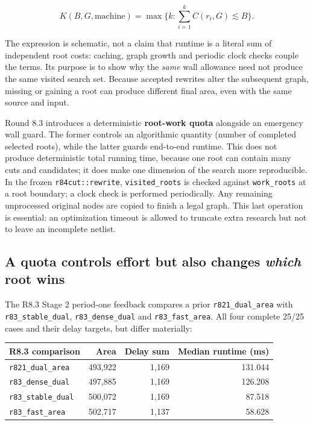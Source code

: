 \[
K(B,G,\mathrm{machine})=
\max\biggl\{k:\sum_{i=1}^{k}C(r_i,G)\lesssim B\biggr\}.
\]

The expression is schematic, not a claim that runtime is a literal sum of independent root costs: caching, graph growth and periodic clock checks couple the terms. Its purpose is to show why the \emph{same} wall allowance need not produce the same visited search set. Because accepted rewrites alter the subsequent graph, missing or gaining a root can produce different final area, even with the same source and input.

Round 8.3 introduces a deterministic \textbf{root-work quota} alongside an emergency wall guard. The former controls an algorithmic quantity (number of completed selected roots), while the latter guards end-to-end runtime. This does not produce deterministic total running time, because one root can contain many cuts and candidates; it does make one dimension of the search more reproducible. In the frozen \texttt{r84cut::rewrite}, \texttt{visited\_roots} is checked against \texttt{work\_roots} at a root boundary; a clock check is performed periodically. Any remaining unprocessed original nodes are copied to finish a legal graph. This last operation is essential: an optimization timeout is allowed to truncate extra research but not to leave an incomplete netlist.

\subsection{\texorpdfstring{A quota controls effort but also changes \emph{which} root wins}{A quota controls effort but also changes which root wins}}\label{a-quota-controls-effort-but-also-changes-which-root-wins}

The R8.3 Stage 2 period-one feedback compares a prior \texttt{r821\_dual\_area} with \texttt{r83\_stable\_dual}, \texttt{r83\_dense\_dual} and \texttt{r83\_fast\_area}. All four complete 25/25 cases and their delay targets, but differ materially:

\begin{longtable}[]{@{}lrrr@{}}
\toprule\noalign{}
R8.3 comparison & Area & Delay sum & Median runtime (ms) \\
\midrule\noalign{}
\endhead
\bottomrule\noalign{}
\endlastfoot
\texttt{r821\_dual\_area} & 493,922 & 1,169 & 131.044 \\
\texttt{r83\_dense\_dual} & 497,885 & 1,169 & 126.208 \\
\texttt{r83\_stable\_dual} & 500,072 & 1,169 & 87.518 \\
\texttt{r83\_fast\_area} & 502,717 & 1,137 & 58.628 \\
\end{longtable}

